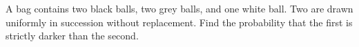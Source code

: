 A bag contains two black balls, two grey balls, and one white ball. Two are drawn uniformly in succession without replacement. Find the probability that the first is strictly darker than the second.

